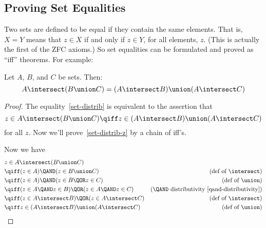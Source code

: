 \subsection{Proving Set Equalities}

Two sets are defined to be equal if they contain the same elements.  That
is, $X = Y$ means that $z \in X$ if and only if $z \in Y$, for all
elements, $z$.  (This is actually the first of the ZFC axioms.)  So set
equalities can be formulated and proved as ``iff'' theorems.  For
example:

\begin{theorem}
Let $A$, $B$, and $C$ be sets.  Then:
\begin{equation}\label{set-distrib}
A \intersect (B \union C) = (A \intersect B) \union (A \intersect C)
\end{equation}
\end{theorem}

\begin{proof}
The equality~\eqref{set-distrib} is equivalent to the assertion that
\begin{equation}\label{set-distrib-z}
  z \in A \intersect (B \union C) \qiff z \in (A \intersect B)
  \union (A \intersect C)
\end{equation}
for all $z$.  Now we'll prove~\eqref{set-distrib-z} by a chain of iff's.

\iffalse
First we need a rule for distributing a propositional $\QAND$ operation
over an $\QOR$ operation.  It's easy to verify by truth-table that
\begin{lemma}\label{prop-distrib}
The propositional formula
\[
P \QAND (Q \QOR R)
\]
and
\[
(P \QAND Q) \QOR (P \QAND R)
\]
are equivalent.
\end{lemma}
\fi

Now we have
\begin{align*}
\lefteqn{z \in A \intersect (B \union C)}\\
& \qiff (z \in A) \QAND (z \in B \union C) & \text{(def of $\intersect$)}\\
& \qiff (z \in A) \QAND (z \in B \QOR z \in C)
                & \text{(def of $\union$)}\\
& \qiff (z \in A \QAND z \in B) \QOR (z \in A \QAND z \in C)
                & \text{(\QAND\ distributivity~\eqref{qand-distributivity})}\\  %
& \qiff (z \in A \intersect B) \QOR (z \in A \intersect C)
                & \text{(def of $\intersect$)}\\
& \qiff z \in (A \intersect B) \union (A \intersect C)
                & \text{(def of $\union$)}
\end{align*}

\end{proof}
  

